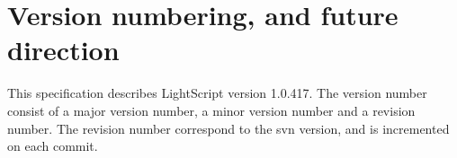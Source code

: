 \documentclass[11pt]{report}
\begin{document}
\begin{comment}

\subsection{Virtual Machine}
The virtual machine is stack-based in order to reduce the footprint of the compiler.
It is implemented with a single larger switch statement as it is running on top of JVM, which has no support for references to labels, etc.
The instruction set is inspired by the JVM and calling conventions on i386, and is also product of the iterative development, such that new instructions are added, as they are needed by the compiler.

\subsection{Compiler}
The core part of the compiler is a function that compiles a single node in the syntax tree. This function also takes a parameter 




\section{Language specification}
The language is base on the EcmaScript specification \cite{ecma232}, and scripts written in LightScript runs unaltered in any EcmaScript compliant interpreter, with a couple of extra functions defined within EcmaScript.
EcmaScript scripts may or may not run within LightScript, as it is only a subset in order to be implemented on low-end devices.


\subsection{Object system and inheritance}
Objects can be seen as a mappings from keys to values.
When iterating through the keys in an object, the order of visiting the keys is unspecified, unlike EcmaScript, where they visited in order they were added to the object.

Inheritance is implemented via prototypes.

\end{comment}

\section{Version numbering, and future  direction}
This specification describes LightScript version 1.0.417.
The version number consist of a major version number, a minor version number and a revision number.
The revision number correspond to the svn version, and is incremented on each commit.
\end{document}
